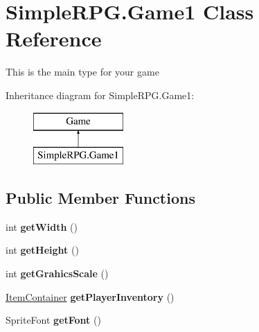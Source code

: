 \hypertarget{class_simple_r_p_g_1_1_game1}{\section{Simple\+R\+P\+G.\+Game1 Class Reference}
\label{class_simple_r_p_g_1_1_game1}
}


This is the main type for your game  


Inheritance diagram for Simple\+R\+P\+G.\+Game1\+:\begin{figure}[H]
\begin{center}
\leavevmode
\includegraphics[height=2.000000cm]{class_simple_r_p_g_1_1_game1}
\end{center}
\end{figure}
\subsection*{Public Member Functions}
\begin{DoxyCompactItemize}
\item 
\hypertarget{class_simple_r_p_g_1_1_game1_acc5c4e36f80f0306fdafa3abb5846965}{int {\bfseries get\+Width} ()}\label{class_simple_r_p_g_1_1_game1_acc5c4e36f80f0306fdafa3abb5846965}

\item 
\hypertarget{class_simple_r_p_g_1_1_game1_acbd455c6801cd38476a757d40868d254}{int {\bfseries get\+Height} ()}\label{class_simple_r_p_g_1_1_game1_acbd455c6801cd38476a757d40868d254}

\item 
\hypertarget{class_simple_r_p_g_1_1_game1_ab43b2f28593ec55d99c0df00e647e4c8}{int {\bfseries get\+Grahics\+Scale} ()}\label{class_simple_r_p_g_1_1_game1_ab43b2f28593ec55d99c0df00e647e4c8}

\item 
\hypertarget{class_simple_r_p_g_1_1_game1_ad16af124f1b89a87e827e19335700fa5}{\hyperlink{class_simple_r_p_g_1_1_item_container}{Item\+Container} {\bfseries get\+Player\+Inventory} ()}\label{class_simple_r_p_g_1_1_game1_ad16af124f1b89a87e827e19335700fa5}

\item 
\hypertarget{class_simple_r_p_g_1_1_game1_aabe60775a0239351456d6fd55eb1c838}{Sprite\+Font {\bfseries get\+Font} ()}\label{class_simple_r_p_g_1_1_game1_aabe60775a0239351456d6fd55eb1c838}

\end{DoxyCompactItemize}
